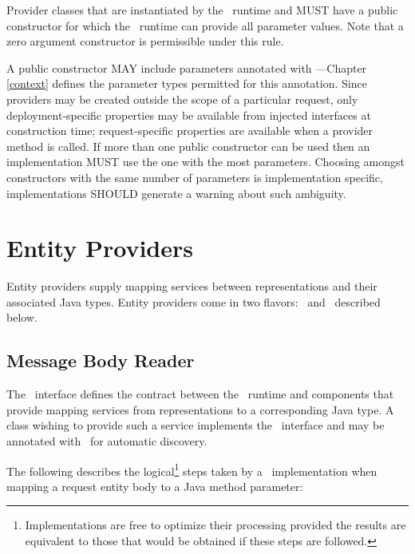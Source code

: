 Provider classes that are instantiated by the \jaxrs\ runtime and MUST have a public constructor for which the \jaxrs\ runtime can provide all parameter values. Note that a zero argument constructor is permissible under this rule.

A public constructor MAY include parameters annotated with \Context ---Chapter \ref{context} defines the parameter types permitted for this annotation. Since providers may be created outside the scope of a particular request, only deployment-specific properties may be available from injected interfaces at construction time; request-specific properties are available when a provider method is called. If more than one public constructor can be used then an implementation MUST use the one with the most parameters. Choosing amongst constructors with the same number of parameters is implementation specific, implementations SHOULD generate a warning about such ambiguity.

\section{Entity Providers}
\label{entity_providers}

Entity providers supply mapping services between representations and their associated Java types. Entity providers come in two flavors: \MsgRead\ and \MsgWrite\ described below. 

\subsection{Message Body Reader}
\label{message_body_reader}

The \MsgRead\ interface defines the contract between the \jaxrs\ runtime and components that provide mapping services from representations to a corresponding Java type. A class wishing to provide such a service implements the \MsgRead\ interface and may be annotated with \Provider\ for automatic discovery.

The following describes the logical\footnote{Implementations are free to optimize their processing provided the results are equivalent to those that would be obtained if these steps are followed.} steps taken by a \jaxrs\ implementation when mapping a request entity body to a Java method parameter:

